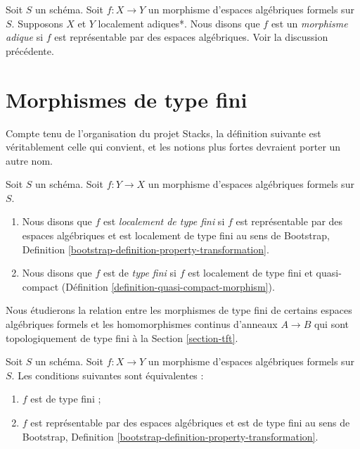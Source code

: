 \begin{definition}
\label{definition-adic-morphism}
Soit $S$ un schéma. Soit $f : X \to Y$ un morphisme d'espaces algébriques formels
sur $S$. Supposons $X$ et $Y$ localement adiques*. Nous disons que $f$ est
un {\it morphisme adique} si $f$ est représentable par des espaces algébriques.
Voir la discussion précédente.
\end{definition}











\section{Morphismes de type fini}
\label{section-finite-type}

\noindent
Compte tenu de l'organisation du projet Stacks, la définition suivante
est véritablement celle qui convient, et les notions plus fortes devraient
porter un autre nom.

\begin{definition}
\label{definition-finite-type}
Soit $S$ un schéma. Soit $f : Y \to X$ un morphisme d'espaces algébriques formels
sur $S$.
\begin{enumerate}
\item Nous disons que $f$ est {\it localement de type fini}
si $f$ est représentable par des espaces algébriques et est localement
de type fini au sens de
Bootstrap, Definition \ref{bootstrap-definition-property-transformation}.
\item Nous disons que $f$ est de {\it type fini} si $f$ est localement de type fini et
quasi-compact (Définition \ref{definition-quasi-compact-morphism}).
\end{enumerate}
\end{definition}

\noindent
Nous étudierons la relation entre les morphismes de type fini de
certains espaces algébriques formels et les
homomorphismes continus d'anneaux $A \to B$ qui sont topologiquement de type fini
à la Section \ref{section-tft}.

\begin{lemma}
\label{lemma-characterize-finite-type}
Soit $S$ un schéma. Soit $f : X \to Y$ un morphisme d'espaces algébriques formels
sur $S$. Les conditions suivantes sont équivalentes :
\begin{enumerate}
\item $f$ est de type fini ;
\item $f$ est représentable par des espaces algébriques et est de type fini au
sens de
Bootstrap, Definition \ref{bootstrap-definition-property-transformation}.
\end{enumerate}
\end{lemma}

